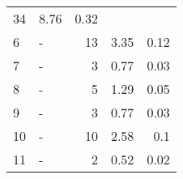 \begin{longtable}{lXrrr}
       \num{34} &
       \num[round-mode=places,round-precision=2]{8.76} &
         \num[round-mode=places,round-precision=2]{0.32} \\

     6 &
     \multicolumn{1}{X}{ -  } &


       \num{13} &
       \num[round-mode=places,round-precision=2]{3.35} &
         \num[round-mode=places,round-precision=2]{0.12} \\

     7 &
     \multicolumn{1}{X}{ -  } &


       \num{3} &
       \num[round-mode=places,round-precision=2]{0.77} &
         \num[round-mode=places,round-precision=2]{0.03} \\

     8 &
     \multicolumn{1}{X}{ -  } &


       \num{5} &
       \num[round-mode=places,round-precision=2]{1.29} &
         \num[round-mode=places,round-precision=2]{0.05} \\

     9 &
     \multicolumn{1}{X}{ -  } &


       \num{3} &
       \num[round-mode=places,round-precision=2]{0.77} &
         \num[round-mode=places,round-precision=2]{0.03} \\

     10 &
     \multicolumn{1}{X}{ -  } &


       \num{10} &
       \num[round-mode=places,round-precision=2]{2.58} &
         \num[round-mode=places,round-precision=2]{0.1} \\

     11 &
     \multicolumn{1}{X}{ -  } &


       \num{2} &
       \num[round-mode=places,round-precision=2]{0.52} &
         \num[round-mode=places,round-precision=2]{0.02} \\


\end{longtable}
